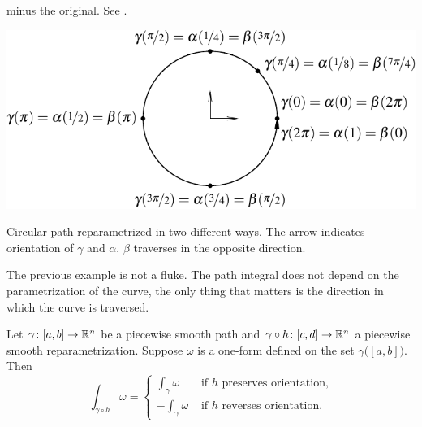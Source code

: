 \begin{example}
minus the original.  See .
\begin{myfigureht}
\includegraphics{figures/circlepathrepar}
\caption{Circular path reparametrized in two different ways. The arrow
indicates orientation of $\gamma$ and $\alpha$. $\beta$ traverses in the
opposite direction.\label{fig:circlepathrepar}}
\end{myfigureht}
\end{example}

The previous example is not a fluke.
The path integral does not depend on the parametrization of
the curve, the only thing that matters is the direction in which the curve
is traversed.

\begin{prop} \label{mv:prop:pathintrepararam}
Let $\gamma \colon [a,b] \to {\mathbb{R}}^n$ be a piecewise smooth path and
$\gamma \circ h \colon [c,d] \to {\mathbb{R}}^n$ a piecewise smooth reparametrization.
Suppose $\omega$ is a one-form defined on the set $\gamma\bigl([a,b]\bigr)$.  Then
\begin{equation*}
\int_{\gamma \circ h} \omega =
\begin{cases}
\int_{\gamma} \omega & \text{ if $h$ preserves orientation,}\\
-\int_{\gamma} \omega & \text{ if $h$ reverses orientation.}
\end{cases}
\end{equation*}
\end{prop}

